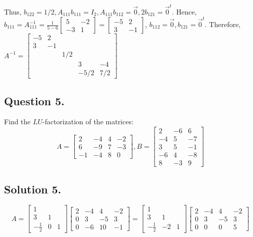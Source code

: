 \documentclass{article}
\begin{document}
Thus, $b_{122}=1/2,A_{111}b_{111}=I_2,A_{111}b_{112}=\Vec{0},2b_{121}=\Vec{0}^t$.\newline
Hence, $b_{111}=A_{111}^{-1}=\frac{1}{5-6}\left[\begin{array}{rr}5&-2\\-3&1\end{array}\right]=\left[\begin{array}{rr}-5&2\\3&-1\end{array}\right]$, $b_{112}=\Vec{0},b_{121}=\Vec{0}^t$.\newline
Therefore, $A^{-1}=\left[\begin{array}{rrrrr}-5&2\\3&-1\\&&1/2\\&&&3&-4\\&&&-5/2&7/2\end{array}\right]$
\subsection*{Question 5.}
Find the $LU$-factorization of the matrices:
\[A=\left[\begin{array}{rrrr}2&-4&4&-2\\6&-9&7&-3\\-1&-4&8&0\end{array}\right], B=\left[\begin{array}{rrr}2&-6&6\\-4&5&-7\\3&5&-1\\-6&4&-8\\8&-3&9\end{array}\right]\]
\subsection*{Solution 5.}
\[A=\left[\begin{array}{rrr}1\\3&1\\-\frac{1}{2}&0&1\end{array}\right] \left[\begin{array}{rrrr}2&-4&4&-2\\0&3&-5&3\\0&-6&10&-1\end{array}\right]=\left[\begin{array}{rrr}1\\3&1\\-\frac{1}{2}&-2&1\end{array}\right] \left[\begin{array}{rrrr}2&-4&4&-2\\0&3&-5&3\\0&0&0&5\end{array}\right]\]
\end{document}
